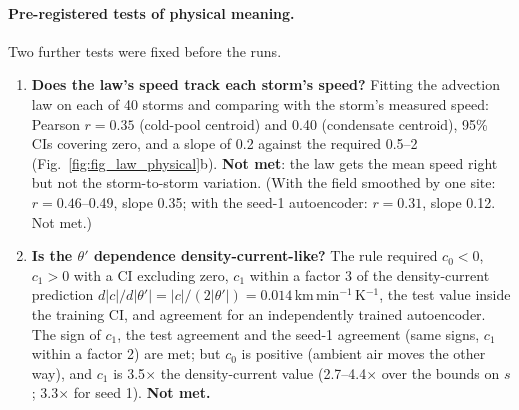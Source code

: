 \documentclass[11pt]{article}
\begin{document}
\paragraph{Pre-registered tests of physical meaning.} Two further tests were fixed before the runs.
\begin{enumerate}
\item \textbf{Does the law's speed track each storm's speed?} Fitting the advection law on each of 40 storms and comparing with the storm's measured speed: Pearson $r = 0.35$ (cold-pool centroid) and 0.40 (condensate centroid), 95\% CIs covering zero, and a slope of 0.2 against the required 0.5--2 (Fig.~\ref{fig:fig_law_physical}b). \textbf{Not met}: the law gets the mean speed right but not the storm-to-storm variation. (With the field smoothed by one site: $r = 0.46$--0.49, slope 0.35; with the seed-1 autoencoder: $r = 0.31$, slope 0.12. Not met.)
\item \textbf{Is the $\theta'$ dependence density-current-like?} The rule required $c_0 < 0$, $c_1 > 0$ with a CI excluding zero, $c_1$ within a factor 3 of the density-current prediction $d|c|/d|\theta'| = |c|/(2|\theta'|) = 0.014$\,km\,min$^{-1}$\,K$^{-1}$, the test value inside the training CI, and agreement for an independently trained autoencoder. The sign of $c_1$, the test agreement and the seed-1 agreement (same signs, $c_1$ within a factor 2) are met; but $c_0$ is positive (ambient air moves the other way), and $c_1$ is 3.5$\times$ the density-current value (2.7--4.4$\times$ over the bounds on $s$; 3.3$\times$ for seed 1). \textbf{Not met.}
\end{enumerate}
\end{document}
